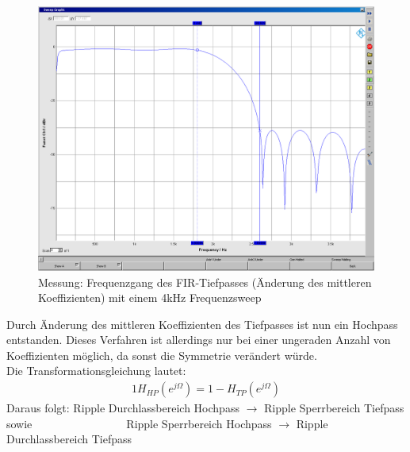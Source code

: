 \begin{figure}[h]
	\centering
	\includegraphics[width=1\linewidth]{Bilder/Attachment_G_1-TP}
	\caption{Messung: Frequenzgang des FIR-Tiefpasses (Änderung des mittleren Koeffizienten) mit einem 4kHz Frequenzsweep}
	\label{fig:Attachment_G_1-TP}
\end{figure}

\noindent Durch Änderung des mittleren Koeffizienten des Tiefpasses ist nun ein Hochpass entstanden.
Dieses Verfahren ist allerdings nur bei einer ungeraden Anzahl von Koeffizienten möglich, da sonst die Symmetrie verändert würde.\\
\noindent Die Transformationsgleichung lautet:
\begin{alignat}{1}
H_{HP}(e^{j\Omega}) = 1-H_{TP}(e^{j\Omega})
\end{alignat}
\noindent Daraus folgt: Ripple Durchlassbereich Hochpass $\rightarrow$ Ripple Sperrbereich Tiefpass \\
sowie~~~~~~~~~~~~~~~~~Ripple Sperrbereich Hochpass $\rightarrow$ Ripple Durchlassbereich Tiefpass

 
